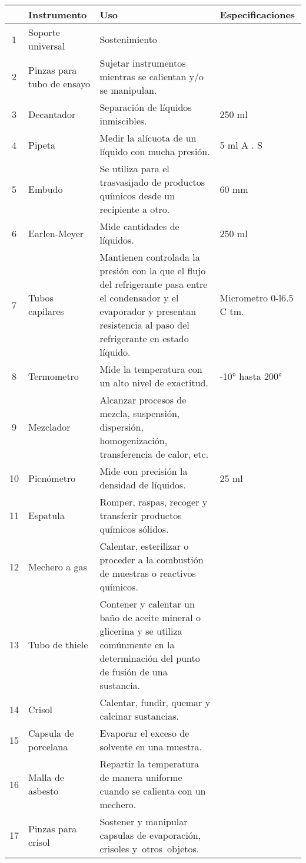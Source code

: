 
\begin{table*}[p]
\begin{tabular}{|c|p{2.5cm}|p{10.5cm}|p{3cm}|}
\hline
& \bfseries Instrumento & \bfseries Uso & \bfseries Especificaciones \\
\hline
1 & Soporte universal & Sostenimiento & \\
\hline
2 & Pinzas para tubo de ensayo & Sujetar instrumentos mientras se calientan y/o se manipulan. & \\
\hline
3 & Decantador & Separación de líquidos inmiscibles. & 250 ml \\
\hline
4 & Pipeta & Medir la alícuota de un líquido con mucha presión. & 5 ml A . S \\
\hline
5 & Embudo & Se utiliza para el trasvasijado de productos químicos desde un recipiente a otro. & 60 mm \\
\hline
6 & Earlen-Meyer & Mide cantidades de líquidos. & 250 ml \\
\hline
7 & Tubos capilares & Mantienen controlada la presión con la que el flujo del refrigerante pasa entre el condensador y el evaporador y presentan resistencia al paso del refrigerante en estado líquido. & Micrometro 0-l6.5 C tm. \\
\hline
8 & Termometro & Mide la temperatura con un alto nivel de exactitud. & -10° hasta 200° \\
\hline
9 & Mezclador & Alcanzar procesos de mezcla, suspensión, dispersión, homogenización, transferencia de calor, etc. & \\
\hline
10 & Picnómetro & Mide con precisión la densidad de líquidos. & 25 ml \\
\hline
11 & Espatula & Romper, raspas, recoger y transferir productos químicos sólidos. & \\
\hline
12 & Mechero a gas & Calentar, esterilizar o proceder a la combustión de muestras o reactivos químicos. & \\
\hline
13 & Tubo de thiele & Contener y calentar un baño de aceite mineral o glicerina y se utiliza comúnmente en la determinación del punto de fusión de una sustancia. & \\
\hline
14 & Crisol & Calentar, fundir, quemar y calcinar sustancias. & \\
\hline
15 & Capsula de porcelana & Evaporar el exceso de solvente en una muestra. & \\
\hline
16 & Malla de asbesto &  Repartir la temperatura de manera uniforme cuando se calienta con un mechero. & \\
\hline
17 & Pinzas para crisol & Sostener y manipular capsulas de evaporación, crisoles y otros objetos. & \\
\hline
\end{tabular}
\caption{Matriz de los materiales suministrados.}
\label{tab:materiales}
\end{table*}
